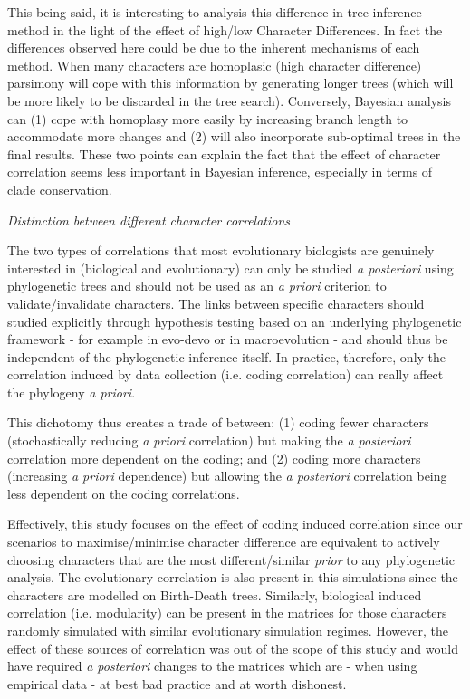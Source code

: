 \documentclass[12pt,letterpaper]{article}
\renewcommand{\subsection}[1]{%
\bigskip
\begin{center}
\begin{large}
\normalfont\itshape #1
\end{large}
\end{center}}
\begin{document}
This being said, it is interesting to analysis this difference in tree inference method in the light of the effect of high/low Character Differences.
In fact the differences observed here could be due to the inherent mechanisms of each method.
When many characters are homoplasic (high character difference) parsimony will cope with this information by generating longer trees (which will be more likely to be discarded in the tree search).
Conversely, Bayesian analysis can (1) cope with homoplasy more easily by increasing branch length to accommodate more changes and (2) will also incorporate sub-optimal trees in the final results.
These two points can explain the fact that the effect of character correlation seems less important in Bayesian inference, especially in terms of clade conservation.

\subsection{Distinction between different character correlations}
The two types of correlations that most evolutionary biologists are genuinely interested in (biological and evolutionary) can only be studied \textit{a posteriori} using phylogenetic trees and should not be used as an \textit{a priori} criterion to validate/invalidate characters.
The links between specific characters should studied explicitly through hypothesis testing based on an underlying phylogenetic framework - for example in evo-devo \citep[e.g.][]{goswami2006morphological} or in macroevolution \citep[e.g.][]{fitzjohn2014much} - and should thus be independent of the phylogenetic inference itself.
In practice, therefore, only the correlation induced by data collection (i.e. coding correlation) can really affect the phylogeny \textit{a priori}.

This dichotomy thus creates a trade of between: (1) coding fewer characters (stochastically reducing \textit{a priori} correlation) but making the \textit{a posteriori} correlation more dependent on the coding; and (2) coding more characters (increasing \textit{a priori} dependence) but allowing the \textit{a posteriori} correlation being less dependent on the coding correlations.

Effectively, this study focuses on the effect of coding induced correlation since our scenarios to maximise/minimise character difference are equivalent to actively choosing characters that are the most different/similar \textit{prior} to any phylogenetic analysis.
The evolutionary correlation is also present in this simulations since the characters are modelled on Birth-Death trees.
Similarly, biological induced correlation (i.e. modularity) can be present in the matrices for those characters randomly simulated with similar evolutionary simulation regimes.
However, the effect of these sources of correlation was out of the scope of this study and would have required \textit{a posteriori} changes to the matrices which are - when using empirical data - at best bad practice and at worth dishonest.
\end{document}

